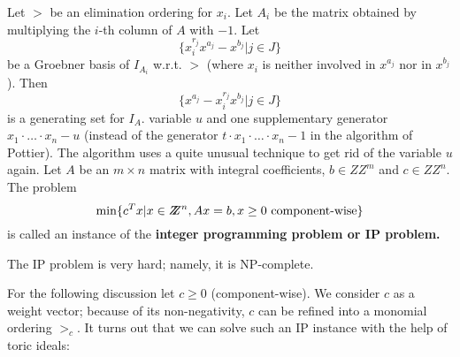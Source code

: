 Let $>$ be an elimination ordering for $x_i$. Let $A_i$ be the matrix
obtained by multiplying the $i$-th column of $A$ with $-1$. Let
$$\{x_i^{r_j} x^{a_j} - x^{b_j} | j\in J \}$$
be a Groebner basis of $I_{A_i}$ w.r.t. $>$ (where $x_i$ is neither
involved in $x^{a_j}$ nor in $x^{b_j}$). Then
$$\{x^{a_j} - x_i^{r_j} x^{b_j} | j\in J \}$$
is a generating set for $I_A$.
variable $u$ and one supplementary generator $x_1\cdot\ldots\cdot x_n -
u$ (instead of the generator $t\cdot x_1\cdot\ldots\cdot x_n -1$ in
the algorithm of Pottier). The algorithm uses a quite unusual technique to
get rid of the variable $u$ again.
Let $A$ be an $m\times n$ matrix with integral coefficients, $b\in
Z\!\!\! Z^m$ and $c\in Z\!\!\! Z^n$. The problem
$$ \min\{c^T x | x\in Z\!\!\! Z^n, Ax=b, x\geq 0\hbox{
component-wise}\} $$
is called an instance of the \bf integer programming problem \rm or
\bf IP problem. \rm

The IP problem is very hard; namely, it is NP-complete.

For the following discussion let $c\geq 0$ (component-wise). We
consider $c$ as a weight vector; because of its non-negativity, $c$ can
be refined into a monomial ordering $>_c$. It turns out that we can
solve such an IP instance with the help of toric ideals:

